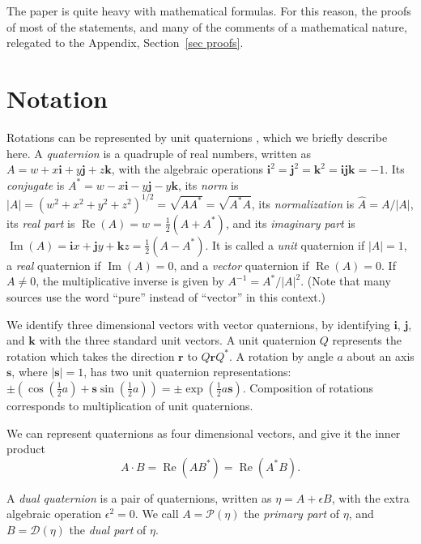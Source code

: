 \documentclass[reqno,12pt]{amsart}
\newcommand\bi{\bm i}
\newcommand\bj{\bm j}
\newcommand\bk{\bm k}
\DeclareMathOperator\realpart{Re}
\DeclareMathOperator\imagpart{Im}
\begin{document}
The paper is quite heavy with mathematical formulas.  For this reason, the proofs of most of the statements, and many of the comments of a mathematical nature, relegated to the Appendix, Section~\ref{sec proofs}.

\section{Notation}

Rotations can be represented by unit quaternions \cite{quaternions1,quaternions2}, which we briefly describe here.  A \emph{quaternion} is a quadruple of real numbers, written as $A = w + x \bi + y \bj + z \bk$, with the algebraic operations $\bi^2 = \bj^2 = \bk^2 = \bi \bj \bk = -1$.  Its \emph{conjugate} is $A^* = w - x \bi - y \bj - y \bk$, its \emph{norm} is $|A| = (w^2+x^2+y^2+z^2)^{1/2} = \sqrt{A A^*} = \sqrt{A^* A}$, its \emph{normalization} is $\widehat A = A/|A|$, its \emph{real part} is $\realpart(A) = w = \tfrac12(A + A^*)$, and its \emph{imaginary part} is $\imagpart(A) = \bi x + \bj y + \bk z = \tfrac12(A - A^*)$.  It is called a \emph{unit} quaternion if $|A| = 1$, a \emph{real} quaternion if $\imagpart(A) = 0$, and a \emph{vector} quaternion if $\realpart(A) = 0$.  If $A \ne 0$, the multiplicative inverse is given by $A^{-1} = A^*/|A|^2$.  (Note that many sources use the word ``pure'' instead of ``vector'' in this context.)

We identify three dimensional vectors with vector quaternions, by identifying $\bi$, $\bj$, and $\bk$ with the three standard unit vectors.  A unit quaternion $Q$ represents the rotation which takes the direction $\bm r$ to $Q \bm r Q^*$.  A rotation by angle $a$ about an axis $\bm s$, where $|\bm s| = 1$, has two unit quaternion representations: $\pm(\cos(\tfrac12 a) + \bm s \sin(\tfrac12 a)) = \pm \exp(\tfrac12 a \bm s)$.  Composition of rotations corresponds to multiplication of unit quaternions.

We can represent quaternions as four dimensional vectors, and give it the inner product
\begin{equation}
A \cdot B = \realpart(A B^*) = \realpart(A^* B) .
\end{equation}

A \emph{dual quaternion} is a pair of quaternions, written as $\eta = A + \epsilon B$, with the extra algebraic operation $\epsilon^2 = 0$.  We call $A = \mathcal P(\eta)$ the \emph{primary part} of $\eta$, and $B = \mathcal D(\eta)$ the \emph{dual part} of $\eta$.
\end{document}
